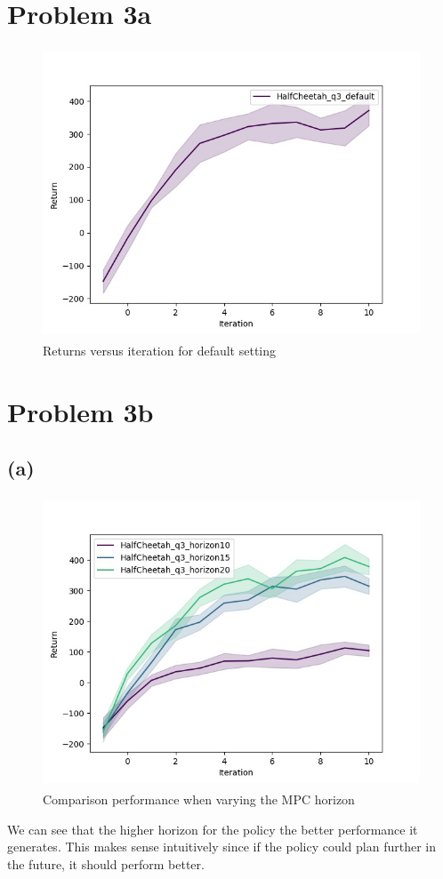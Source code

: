 \documentclass[12pt]{article}
\begin{document}
\newpage
\section*{Problem 3a}
\begin{figure}[H]
  \centering
  \includegraphics[height=3.4in]{HalfCheetah_q3_default.jpg}
  \caption{Returns versus iteration for default setting}
\end{figure}

\newpage
\section*{Problem 3b}

\subsection*{(a)}
\begin{figure}[H]
  \centering
  \includegraphics[height=3.4in]{HalfCheetah_q3_mpc_horizon.jpg}
  \caption{Comparison performance when varying the MPC horizon}
\end{figure}
We can see that the higher horizon for the policy the better performance it generates. This makes sense intuitively since if the policy could plan further in the future, it should perform better.
\end{document}
